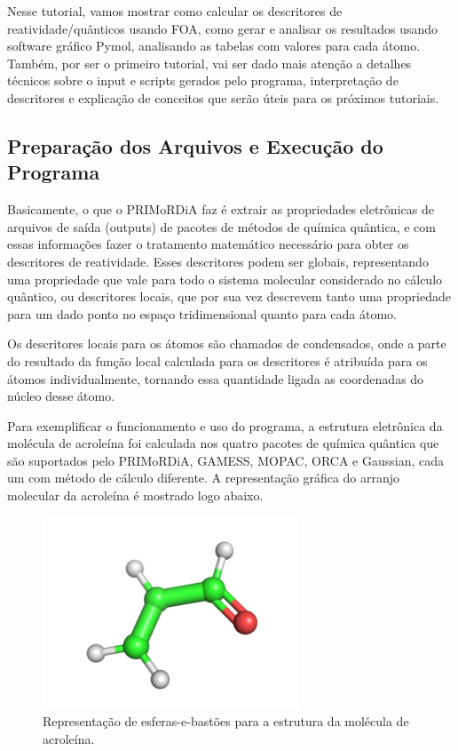 \documentclass[a4paper,11pt]{refart}
\begin{document}
Nesse tutorial, vamos mostrar como calcular os descritores de reatividade/quânticos usando FOA, como gerar e analisar os resultados usando software gráfico Pymol, analisando as tabelas com valores para cada átomo. Também, por ser o primeiro tutorial, vai ser dado mais atenção a detalhes técnicos sobre o input e scripts gerados pelo programa, interpretação de descritores e explicação de conceitos que serão úteis para os próximos tutoriais.

\subsection{Preparação dos Arquivos e Execução do Programa}

Basicamente, o que o PRIMoRDiA faz é extrair as propriedades eletrônicas de arquivos de saída (outputs) de pacotes de métodos de química quântica, e com essas informações fazer o tratamento matemático necessário para obter os descritores de reatividade. Esses descritores podem ser globais, representando uma propriedade que vale para todo o sistema molecular considerado no cálculo quântico, ou descritores locais, que por sua vez descrevem tanto uma propriedade para um dado ponto no espaço tridimensional quanto para cada átomo. 

Os descritores locais para os átomos são chamados de condensados, onde a parte do resultado da função local calculada para os descritores é atribuída para os átomos individualmente, tornando essa quantidade ligada as coordenadas do núcleo desse átomo.

Para exemplificar o funcionamento e uso do programa, a estrutura eletrônica da molécula de acroleína foi calculada nos quatro pacotes de química quântica que são suportados pelo PRIMoRDiA, GAMESS, MOPAC, ORCA e Gaussian, cada um com método de cálculo diferente. A representação gráfica do arranjo molecular da acroleína é mostrado logo abaixo.


\hspace*{-\leftmarginwidth}
\begin{minipage}{\fullwidth}
\begin{figure}[H]
\begin{center}
\includegraphics[width=3in]{images/img0}
\caption{Representação de esferas-e-bastões para a estrutura da molécula de acroleína.}
\label{fig_tut1_1}
\end{center}
\end{figure}
\end{minipage}	
\end{document}
